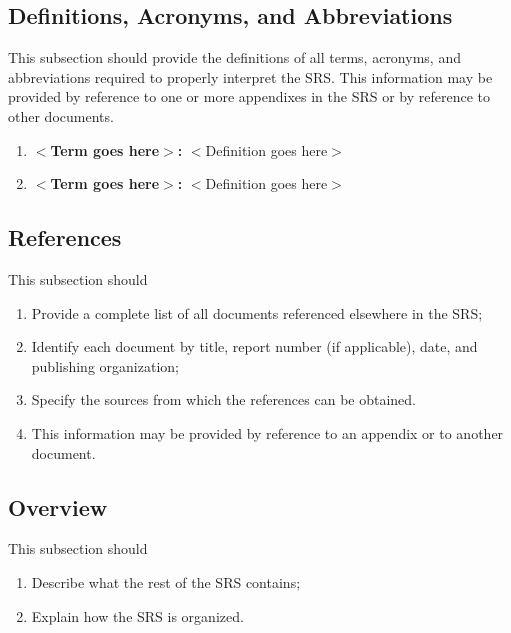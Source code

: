 \documentclass[draftclsnofoot,onecolumn,10pt]{IEEEtran}
\begin{document}
\subsection{Definitions, Acronyms, and Abbreviations}
This subsection should provide the definitions of all terms, acronyms, and
abbreviations required to properly interpret the SRS. This information may be
provided by reference to one or more appendixes in the SRS or by reference to
other documents.
\begin{enumerate}
	\item \textbf{$<$Term goes here$>$:} $<$Definition goes here$>$
	\item \textbf{$<$Term goes here$>$:} $<$Definition goes here$>$
\end{enumerate}


\subsection{References}
This subsection should
\begin{enumerate}
	\item Provide a complete list of all documents referenced elsewhere in the SRS;
	\item Identify each document by title, report number (if applicable), date,
		and publishing organization;
	\item Specify the sources from which the references can be obtained.
	\item This information may be provided by reference to an appendix or to
		another document.
\end{enumerate}

\subsection{Overview}
This subsection should
\begin{enumerate}
	\item Describe what the rest of the SRS contains;
	\item Explain how the SRS is organized.
\end{enumerate}


\end{document}
